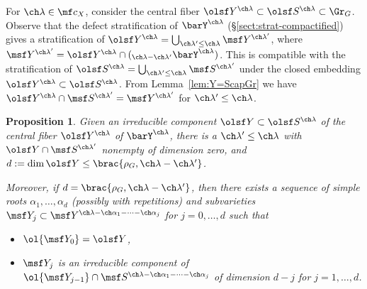 \documentclass[final]{amsart}
\newtheorem{prop}[subsubsection]{Proposition}
\theoremstyle{remark}
\theoremstyle{definition}
\numberwithin{equation}{section}
\begin{document}
\medskip

For $\ch\lambda \in \mf c_X$, consider
the central fiber $\olsf Y^{\ch\lambda} \subset \olsf S^{\ch\lambda} \subset \Gr_G$. 
Observe that the defect stratification of $\barY^{\ch\lambda}$ (\S \ref{sect:strat-compactified}) gives a stratification
of $\olsf Y^{\ch\lambda} = \bigcup_{\ch\lambda' \le \ch\lambda} \msf Y^{\ch\lambda'}$,
where $\msf Y^{\ch\lambda'} = \olsf Y^{\ch\lambda}\cap ({_{\ch\lambda-\ch\lambda'}} \barY^{\ch\lambda})$. 
This is compatible with the stratification of $\olsf S^{\ch\lambda} = \bigcup_{\ch\lambda'\le\ch\lambda}
\msf S^{\ch\lambda'}$ under the closed embedding $\olsf Y^{\ch\lambda}\subset \olsf S^{\ch\lambda}$.
From Lemma~\ref{lem:Y=ScapGr} we have $\olsf Y^{\ch\lambda} \cap \msf S^{\ch\lambda'} = \msf Y^{\ch\lambda'}$
for $\ch\lambda' \le \ch\lambda$.


\begin{prop}
\label{prop:intersections}
 Given an irreducible component $\olsf Y \subset \olsf S^{\ch\lambda}$ of the central fiber $\olsf Y^{\ch\lambda}$ of $\barY^{\ch\lambda}$, there is a $\ch\lambda'\le \ch\lambda$ with $\olsf Y \cap \msf S^{\ch\lambda'}$ nonempty of dimension zero, and $d:=\dim \olsf Y \le \brac{ \rho_G, \ch\lambda-\ch\lambda'}$. 

Moreover, if $d= \brac{ \rho_G, \ch\lambda-\ch\lambda'}$, then there exists a sequence of simple roots $\alpha_1, \dots,\alpha_d$ (possibly with repetitions) 
and subvarieties $\msf Y_j \subset \msf Y^{\ch\lambda-\ch\alpha_1-\dotsb-\ch\alpha_j}$ for $j=0,\dotsc,d$  such that 
\begin{itemize}
\item $\ol{\msf Y_0} = \olsf Y$,
\item $\msf Y_j$ is an irreducible component of $\ol{\msf Y_{j-1}} \cap \msf S^{\ch\lambda - \ch\alpha_1 - \cdots -\ch\alpha_j}$ of dimension $d-j$ for $j=1,\dotsc, d$.
\end{itemize}
\end{prop}
\end{document}
